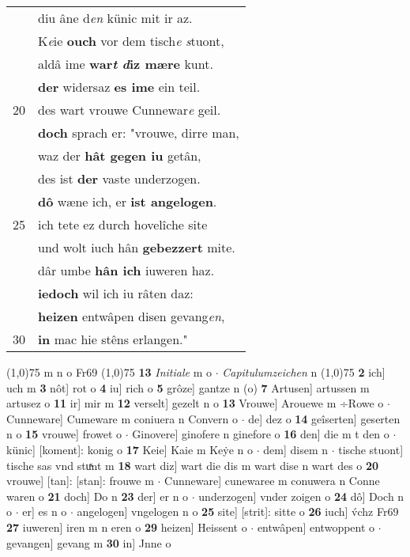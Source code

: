 \documentclass[8pt,a4paper,notitlepage]{article}
\begin{document}
\begin{table}[ht]
\begin{minipage}[t]{0.5\linewidth}
\begin{tabular}{rl}
 & diu âne d\textit{en} künic mit ir az.\\ 
 & K\textit{e}ie \textbf{ouch} vor dem tisch\textit{e} \textit{s}tuont,\\ 
 & aldâ ime \textbf{war\textit{t} \textit{d}iz mære} kunt.\\ 
 & \textbf{der} widersaz \textbf{es ime} ein teil.\\ 
20 & des wart vrouwe Cunnewar\textit{e} geil.\\ 
 & \textbf{doch} sprach er: "vrouwe, dirre man,\\ 
 & waz der \textbf{hât gegen iu} getân,\\ 
 & des ist \textbf{der} vaste underzogen.\\ 
 & \textbf{dô} wæne ich, er \textbf{ist angelogen}.\\ 
25 & ich tete ez durch hovelîche site\\ 
 & und wolt iuch hân \textbf{gebezzert} mite.\\ 
 & dâr umbe \textbf{hân ich} iuweren haz.\\ 
 & \textbf{iedoch} wil ich iu râten daz:\\ 
 & \textbf{heizen} entwâpen disen gevang\textit{en},\\ 
30 & \textbf{in} mac hie stêns erlangen."\\ 
\end{tabular}
\scriptsize
\line(1,0){75} \newline
m n o Fr69 \newline
\line(1,0){75} \newline
\textbf{13} \textit{Initiale} m o   $\cdot$ \textit{Capitulumzeichen} n  \newline
\line(1,0){75} \newline
\textbf{2} ich] uch m \textbf{3} nôt] rot o \textbf{4} iu] rich o \textbf{5} grôze] gantze n (o) \textbf{7} Artusen] artussen m artusez o \textbf{11} ir] mir m \textbf{12} verselt] gezelt n o \textbf{13} Vrouwe] Arouewe m ÷Rowe o  $\cdot$ Cunneware] Cumeware m coniuera n Convern o  $\cdot$ de] dez o \textbf{14} geîserten] geserten n o \textbf{15} vrouwe] frowet o  $\cdot$ Ginovere] ginofere n ginefore o \textbf{16} den] die m t den o  $\cdot$ künic] [koment]: konig o \textbf{17} Keie] Kaie m Keẏe n o  $\cdot$ dem] disem n  $\cdot$ tische stuont] tische sas vnd stuͯnt m \textbf{18} wart diz] wart die dis m wart dise n wart des o \textbf{20} vrouwe] [tan]: [stan]: frouwe m  $\cdot$ Cunneware] cunewaree m conuwera n Conne waren o \textbf{21} doch] Do n \textbf{23} der] er n o  $\cdot$ underzogen] vnder zoigen o \textbf{24} dô] Doch n o  $\cdot$ er] es n o  $\cdot$ angelogen] vngelogen n o \textbf{25} site] [strit]: sitte o \textbf{26} iuch] v́chz Fr69 \textbf{27} iuweren] iren m n eren o \textbf{29} heizen] Heissent o  $\cdot$ entwâpen] entwoppent o  $\cdot$ gevangen] gevang m \textbf{30} in] Jnne o \newline
\end{minipage}
\end{table}
\end{document}
